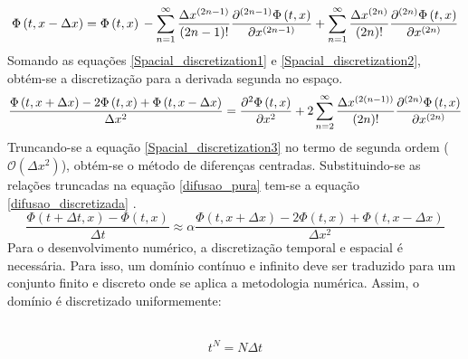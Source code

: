 \documentclass[10pt,twoside,a4paper]{article}
\begin{document}
\begin{equation} \label{Spacial_discretization2}
	\Phi \left(t, x-\Delta x\right)= \Phi \left(t, x\right) \\
	 -\sum\limits_{n=1}^{\infty} \frac{\Delta x^{\left(2n-1\right)}}{\left(2n-1\right)!} \frac{\partial^{\left(2n-1\right)} \Phi \left(t, x\right)}{\partial x^{\left(2n-1\right)}}\\
	 +\sum\limits_{n=1}^{\infty} \frac{\Delta x^{\left(2n\right)}}{\left(2n\right)!} \frac{\partial^{\left(2n\right)} \Phi \left(t, x\right)}{\partial x^{\left(2n\right)}}
\end{equation}
Somando as equações \ref{Spacial_discretization1} e \ref{Spacial_discretization2}, obtém-se a discretização para a derivada segunda no espaço.
\begin{equation} \label{Spacial_discretization3}
\frac{\Phi \left(t, x+\Delta x\right)-2 \Phi \left(t, x\right) + \Phi \left(t, x-\Delta x\right)}{\Delta x^2} = \\
\frac{\partial^{2} \Phi \left(t, x\right)}{\partial x^{2}}+ \\
2 \sum\limits_{n=2}^{\infty} \frac{ \Delta x^{\left(2\left(n-1\right)\right)}}{\left(2n\right)!} \frac{\partial^{\left(2n\right)} \Phi \left(t, x\right)}{\partial x^{\left(2n\right)}}
\end{equation}
Truncando-se a equação \ref{Spacial_discretization3} no termo de segunda ordem ($\mathcal{O}(\Delta x^2)$), obtém-se o método de diferenças centradas.
Substituindo-se as relações truncadas na equação \ref{difusao_pura} tem-se a equação \ref{difusao_discretizada} .
\begin{equation} \label{difusao_discretizada}
\frac{\Phi \left(t+\Delta t, x\right)-\Phi \left(t, x\right)}{\Delta t}\approx \alpha \frac{\Phi \left(t, x+\Delta x\right)-2 \Phi \left(t, x\right) + \Phi \left(t, x-\Delta x\right)}{\Delta x^2}%
\end{equation}
Para o desenvolvimento numérico, a discretização temporal e espacial é necessária. Para isso, um domínio contínuo e infinito deve ser traduzido para um conjunto finito e discreto onde se aplica a metodologia numérica. Assim, o domínio é discretizado uniformemente:\\
\\
\begin{minipage}[!h]{0.40\textwidth} 
	\begin{equation}
		t^N = N \Delta t
	\end{equation}
\end{minipage}
\end{document}
